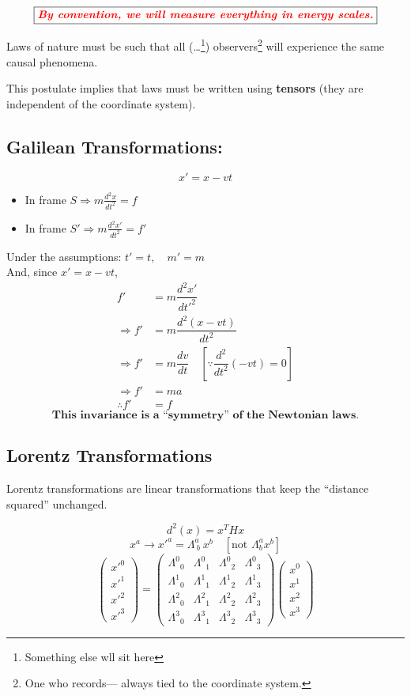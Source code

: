 \documentclass[14pt]{article} %
\begin{document}
$$\fbox{\textcolor{red}{\textbf{\textit{By convention, we will measure everything in energy scales.}}}}$$
\vspace{0.3cm}
\begin{tcolorbox}[proofbox, title=Postulate 1 :]
Laws of nature must be such that all (\ldots \footnote{Something else wll sit here}) observers\footnote{One who records--- always tied to the coordinate system.} will experience the same causal phenomena.
\end{tcolorbox}
\noindent
This postulate implies that laws must be written using \textbf{tensors} (they are independent of the coordinate system).
\newpage
\subsection*{Galilean Transformations:}
$$ x' = x - vt $$
\begin{itemize}
    \item In frame $S \Rightarrow m \frac{d^2x}{dt^2} = f$
    \item In frame $S' \Rightarrow m \frac{d^2x'}{dt^2} = f'$
\end{itemize}
Under the assumptions: \quad $t' = t, \quad m' = m$ \\
And, since $x' = x - vt$,
\begin{align*}
    f' &= m \dfrac{d^2 x'}{dt'^2} \\
    \Rightarrow f' &= m \dfrac{d^2 (x - vt)}{dt^2} \\
    \Rightarrow f' &= m \dfrac{dv}{dt} \quad [\because\dfrac{d^2}{dt^2}(-vt) = 0] \\
    \Rightarrow f' &= ma \\
    \therefore f'&= f
\end{align*}
$$ \textbf{This invariance is a ``symmetry'' of the Newtonian laws.} $$
\subsection*{Lorentz Transformations}
Lorentz transformations are linear transformations that keep the ``distance squared'' unchanged.

\[
d^2(x) = x^T H x
\]
\[
x^a \rightarrow x'^a = \Lambda^a_{~b}~x^b \quad [\text{not } \Lambda^a_{b} x^b]
\]
\[
\begin{pmatrix}
x'^0 \\
x'^1 \\
x'^2 \\
x'^3
\end{pmatrix}
=
\begin{pmatrix}
\Lambda^0{}_0 & \Lambda^0{}_1 & \Lambda^0{}_2 & \Lambda^0{}_3 \\
\Lambda^1{}_0 & \Lambda^1{}_1 & \Lambda^1{}_2 & \Lambda^1{}_3 \\
\Lambda^2{}_0 & \Lambda^2{}_1 & \Lambda^2{}_2 & \Lambda^2{}_3 \\
\Lambda^3{}_0 & \Lambda^3{}_1 & \Lambda^3{}_2 & \Lambda^3{}_3
\end{pmatrix}
\begin{pmatrix}
x^0 \\
x^1 \\
x^2 \\
x^3
\end{pmatrix}
\]
\end{document}
